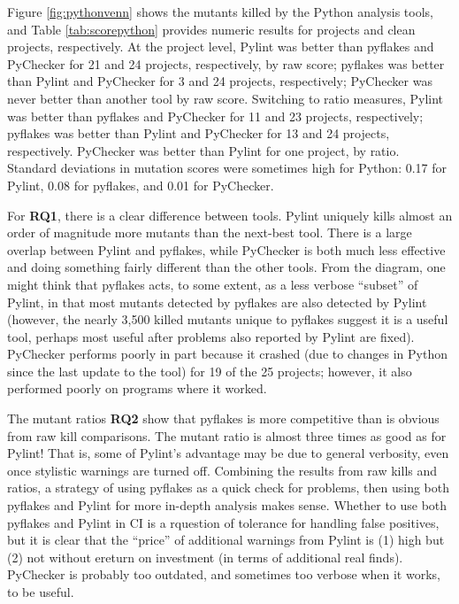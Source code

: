 Figure \ref{fig:pythonvenn} shows the mutants killed by the Python analysis tools, and Table \ref{tab:scorepython} provides numeric results for projects and clean projects, respectively.  At the project level, Pylint was better than pyflakes and PyChecker for 21 and 24 projects, respectively, by raw score; pyflakes was better than Pylint and PyChecker for 3 and 24 projects, respectively; PyChecker was never better than another tool by raw score.  Switching to ratio measures, Pylint was better than pyflakes and PyChecker for 11 and 23 projects, respectively; pyflakes was better than Pylint and PyChecker for 13 and 24 projects, respectively.  PyChecker was better than Pylint for one project, by ratio.  
Standard deviations in mutation scores were sometimes high for Python:  0.17 for Pylint, 0.08 for pyflakes, and 0.01 for PyChecker.

For {\bf RQ1}, there is a clear difference between tools.  Pylint uniquely kills almost an order of magnitude more mutants than the next-best tool.  There is a large overlap between Pylint and pyflakes, while PyChecker is both much less effective and doing something fairly different than the other tools.  From the diagram, one might think that pyflakes acts, to some extent, as a less verbose ``subset'' of Pylint, in that most mutants detected by pyflakes are also detected by Pylint (however, the nearly 3,500 killed mutants unique to pyflakes suggest it is a useful tool, perhaps most useful after problems also reported by Pylint are fixed).  PyChecker performs poorly in part because it crashed (due to changes in Python since the last update to the tool) for 19 of the 25 projects; however, it also performed poorly on programs where it worked.

The mutant ratios {\bf RQ2} show that pyflakes is more competitive than is obvious from raw kill comparisons.  The mutant ratio is almost three times as good as for Pylint!  That is, some of Pylint's advantage may be due to general verbosity, even once stylistic warnings are turned off.   Combining the results from raw kills and ratios, a strategy of using pyflakes as a quick check for problems, then using both pyflakes and Pylint for more in-depth analysis makes sense.  Whether to use both pyflakes and Pylint in CI is a rquestion of tolerance for handling false positives, but it is clear that the ``price'' of additional warnings from Pylint is (1) high but (2) not without ereturn on investment (in terms of additional real finds).  PyChecker is probably too outdated, and sometimes too verbose when it works, to be useful.
 
